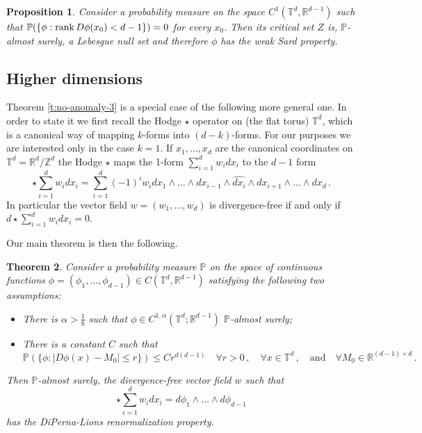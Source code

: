 \documentclass[11pt,reqno]{amsart}
\newtheorem{theorem}{Theorem}[section]
\newtheorem{proposition}[theorem]{Proposition}
\theoremstyle{definition}
\numberwithin{equation}{section}
\begin{document}
\begin{proposition}\label{p:weak-Sard}
Consider a probability measure on the space $C^1 (\mathbb T^d, \mathbb R^{d-1})$ such that 
$\mathbb P (\{\phi: {\rm rank}\, D\phi (x_0) < d-1\})=0$ for every $x_0$. Then its critical set $Z$
is, $\mathbb P$-almost surely, a Lebesgue null set and therefore $\phi$ has the weak Sard property. 
\end{proposition}

\subsection{Higher dimensions} Theorem \ref{t:no-anomaly-3} is a special case of the following more general one. In order to state it we first recall the Hodge $\star$ operator on (the flat torus) $\mathbb T^d$, which is a canonical way of mapping $k$-forms into $(d-k)$-forms. For our purposes we are interested only in the case $k=1$. If $x_1, \ldots , x_d$ are the canonical coordinates on $\mathbb T^d = \mathbb R^d/\mathbb Z^d$ the Hodge $\star$ maps the 1-form $\sum_{i=1}^d w_i dx_i$ to the $d-1$ form
\[
\star \sum_{i=1}^d w_i dx_i =  \sum_{i=1}^d (-1)^i w_i dx_1 \wedge \ldots \wedge dx_{i-1} \wedge \widehat{dx_i} \wedge dx_{i+1} \wedge \ldots \wedge dx_d\, .
\]
In particular the vector field $w= (w_1, \ldots, w_d)$ is divergence-free if and only if $d \star \sum_{i=1}^d w_i dx_i = 0$. 

Our main theorem is then the following.

\begin{theorem}\label{t:no-anomaly-general}
Consider a probability measure $\mathbb P$ on the space of continuous functions $\phi  = (\phi_1, \ldots, \phi_{d-1}) \in C (\mathbb T^d, \mathbb R^{d-1})$ satisfying the following two assumptions:
\begin{itemize}
\item[(a)] There is $\alpha > \frac{1}{8}$ such that $\phi \in C^{1,\alpha} (\mathbb{T}^d; \mathbb{R}^{d-1} )$ $\mathbb P$-almost surely;
\item[(b)] There is a constant $C$ such that 
\begin{equation}\label{e:upper-bound}
\mathbb P (\{\phi : |D\phi (x) - M_0|\leq r\}) \leq C r^{d(d-1)}\quad \forall r>0\, , \quad \forall x\in \mathbb T^d\, , \quad \mbox{and} \quad
\forall M_0 \in \mathbb R^{(d-1)\times d}\, .
\end{equation}
\end{itemize}
Then $\mathbb P$-almost surely, the divergence-free vector field $w$ such that 
\begin{equation}\label{e:Hodge}
\star \sum_{i=1}^d  w_i dx_i = d\phi_1 \wedge \ldots \wedge d\phi_{d-1}
\end{equation}
has the DiPerna-Lions renormalization property.
\end{theorem}
\end{document}
